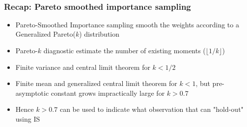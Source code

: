 \documentclass[10pt]{beamer}
\begin{document}
\begin{frame}{}
  \\

\end{frame}

\begin{frame}

\frametitle{Recap: Pareto smoothed importance sampling}

  \begin{itemize}
  \item Pareto-Smoothed Importance sampling smooth the weights according to a Generalized Pareto($k$) distribution
  \item Pareto-$k$ diagnostic estimate the number of existing moments ($\lfloor 1/k \rfloor$)
  \item<2-> Finite variance and central limit theorem for $k<1/2$
  \item<3-> Finite mean and generalized central limit theorem for $k<1$,
    but pre-asymptotic constant grows impractically large for $k>0.7$
  \item<4-> Hence $k>0.7$ can be used to indicate what observation that can "hold-out" using IS
  \end{itemize}
\end{frame}
\end{document}
